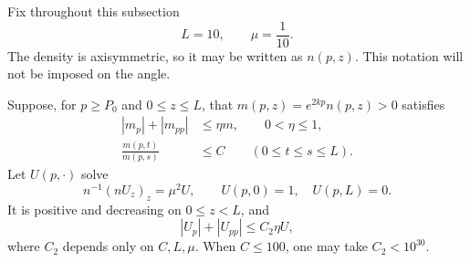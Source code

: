 Fix throughout this subsection
\[
 L=10,\qquad \mu=\frac1{10}.
\]
The density is axisymmetric, so it may be written as \(n(p,z)\).
This notation will not be imposed on the angle.

\begin{lemma}
\label{lem:strip-solution}
Suppose, for \(p\ge P_0\) and \(0\le z\le L\), that
\(m(p,z)=e^{2kp}n(p,z)>0\) satisfies
\begin{equation}\label{eq:strip-comparison-data}
 \begin{aligned}
 |m_p|+|m_{pp}|&\le\eta m,\qquad 0<\eta\le1,\\
 \frac{m(p,t)}{m(p,s)}&\le C
       \qquad(0\le t\le s\le L).
 \end{aligned}
\end{equation}
Let \(U(p,\cdot)\) solve
\begin{equation}\label{eq:strip-ode}
 n^{-1}(nU_z)_z=\mu^2U,\qquad U(p,0)=1,\quad U(p,L)=0.
\end{equation}
It is positive and decreasing on \(0\le z<L\), and
\begin{equation}\label{eq:strip-horizontal-derivatives}
 |U_p|+|U_{pp}|\le C_2\eta U,
\end{equation}
where \(C_2\) depends only on \(C,L,\mu\).
When \(C\le100\), one may take \(C_2<10^{30}\).
\end{lemma}

